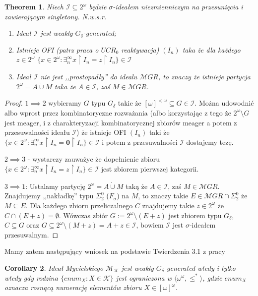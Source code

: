 \documentclass[12pt]{amsart}
\author{Pierwszy Autor}
\author{Adam Kowalski}
\theoremstyle{plain}
\newtheorem{theorem}{Theorem}[section]
\newtheorem{corollary}[theorem]{Corollary}
\theoremstyle{definition}
\theoremstyle{remark}
\newcommand{\ca}{2^{\omega}}
\newcommand{\cantor}{\ca}
\newcommand{\finsub}{[\omega]^{<\omega}}
\newcommand{\infsub}{[\omega]^{\omega}}
\newcommand{\meager}{{\mathcal MGR}}
\newcommand{\calI}{\mathcal{I}}
\begin{document}
\begin{theorem}
Niech $\calI \subseteq 2^\omega$ będzie $\sigma$-ideałem niezmienniczym na przesunięcia
i zawierającym singletony.
N.w.s.r.
\begin{enumerate}
\item
  Ideał $\calI$ jest weakly-$G_\delta$-generated;
\item
  Istnieje OFI (patrz praca o $UCR_0$ reaktywacja) $(I_n)$ 
taka że dla każdego $z \in \cantor$ 
  $\lbrace x \in \cantor \colon \exists_{n}^\infty x \restriction I_n = z \restriction I_n \rbrace \in \calI$
\item
  Ideał $\calI$ nie jest ,,prostopadły'' do idealu $\meager$, to znaczy że
istnieje partycja $\cantor = A \dot{\cup} M$ taka że $A \in \calI$, zaś $M \in \meager$.  
\end{enumerate}
\end{theorem}
\begin{proof}
$1 \implies 2$ wybieramy $G$ typu $G_\delta$ takie że $\finsub \subseteq G \in \calI$.
Można udowodnić albo wprost przez kombinatoryczne rozważania (albo
korzystając z tego że $\cantor\setminus G$ jest meager, i z charakteryzacji
kombinatorycznej zbiorów meager a potem z przesuwalności ideału $\calI$) 
że istnieje OFI $(I_n)$ taki że 
$\lbrace x \in \cantor \colon \exists_{n}^\infty x \restriction I_n = \mathbf{0} \restriction I_n \rbrace \in \calI$
i potem z przesuwalności $\calI$ dostajemy tezę.

$2 \implies 3$ - wystarczy zauważyc że dopełnienie zbioru
$\lbrace x \in \cantor \colon \exists_{n}^\infty x \restriction I_n = z \restriction I_n \rbrace \in \calI$
jest zbiorem pierwszej kategorii.

$3 \implies 1$:
Ustalamy partycję $\cantor = A \dot{\cup} M$ taką że $A \in \calI$, zaś $M \in \meager$.
Znajdujemy ,,nakładkę'' typu $\Sigma^0_2$ ($F_{\sigma}$) na $M$, to znaczy
takie $E \in \meager\cap \Sigma_2^0$ że $M \subseteq E$.
Dla każdego zbioru przeliczalnego $C$ znajdujemy takie $z \in \cantor$ że
$C \cap (E + z) = \emptyset$.
Wówczas zbiór $G := \cantor\setminus(E + z)$ jest zbiorem typu $G_{\delta}$,
$C \subseteq G$ oraz $G \subseteq \cantor \setminus (M + z) = A + z \in \calI$,
bowiem $\calI$ jest $\sigma$-ideałem przesuwalnym.
\end{proof}

Mamy zatem następujący wniosek na podstawie
Twierdzenia 3.1 z pracy 

\begin{corollary}
  Ideał Mycielskiego $\mathcal{M}_{\mathcal{K}}$ jest weakly-$G_\delta$
  generated wtedy i tylko wtedy gdy rodzina $\lbrace \mathit{enum}_X\colon X \in \mathcal{K}\rbrace$
  jest ograniczona w $\langle\omega^\omega, \leq^*\rangle$,
  gdzie $\mathit{enum}_X$ oznacza rosnącą numerację elementów zbioru $X \in \infsub$.
\end{corollary}
\end{document}
